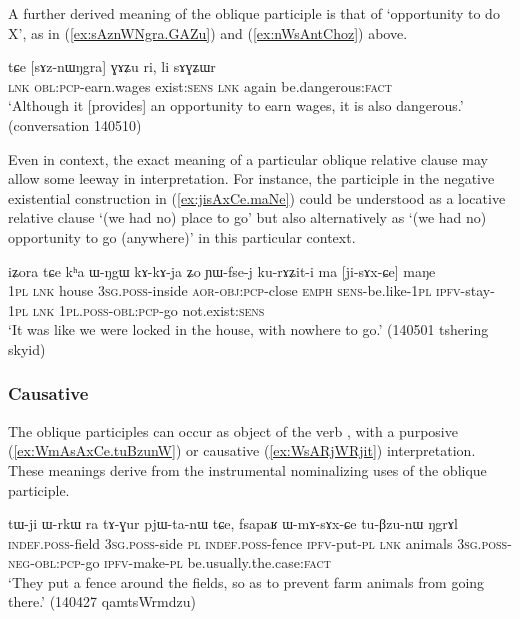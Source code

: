 A further derived meaning of the oblique participle is that of `opportunity to do X', as in (\ref{ex:sAznWNgra.GAZu}) and (\ref{ex:nWsAntChoz}) above.

\begin{exe}
\ex \label{ex:sAznWNgra.GAZu}
\gll tɕe [sɤz-nɯŋgra] ɣɤʑu ri, li sɤɣʑɯr \\
\textsc{lnk} \textsc{obl}:\textsc{pcp}-earn.wages exist:\textsc{sens} \textsc{lnk} again be.dangerous:\textsc{fact} \\
\glt `Although it [provides] an opportunity to earn wages, it is also dangerous.' (conversation 140510)
\end{exe}


Even in context, the exact meaning of a particular oblique relative clause may allow some leeway in interpretation. For instance, the participle  in the negative existential construction in (\ref{ex:jisAxCe.maNe}) could be understood as a locative relative clause `(we had no) place to go' but also alternatively as `(we had no) opportunity to go (anywhere)' in this particular context.

\begin{exe}
\ex \label{ex:jisAxCe.maNe}
\gll  iʑora tɕe kʰa ɯ-ŋgɯ kɤ-kɤ-ja ʑo ɲɯ-fse-j ku-rɤʑit-i ma [ji-sɤx-ɕe] maŋe \\
\textsc{1pl} \textsc{lnk} house \textsc{3sg}.\textsc{poss}-inside \textsc{aor}-\textsc{obj}:\textsc{pcp}-close \textsc{emph} \textsc{sens}-be.like-\textsc{1pl} \textsc{ipfv}-stay-\textsc{1pl} \textsc{lnk} \textsc{1pl}.\textsc{poss}-\textsc{obl}:\textsc{pcp}-go not.exist:\textsc{sens} \\
\glt  `It was like we were locked in the house, with nowhere to go.' (140501 tshering skyid)
\end{exe}

\subsubsection{Causative} \label{sec:oblique.participle.causative}
The oblique participles can occur as object of the verb , with a purposive (\ref{ex:WmAsAxCe.tuBzunW}) or causative (\ref{ex:WsARjWRjit}) interpretation. These meanings derive from the instrumental nominalizing uses of the oblique participle. 

\begin{exe}
\ex \label{ex:WmAsAxCe.tuBzunW}
\gll tɯ-ji ɯ-rkɯ ra tɤ-ɣur pjɯ-ta-nɯ tɕe, fsapaʁ ɯ-mɤ-sɤx-ɕe tu-βzu-nɯ ŋgrɤl \\
\textsc{indef}.\textsc{poss}-field \textsc{3sg}.\textsc{poss}-side \textsc{pl} \textsc{indef}.\textsc{poss}-fence \textsc{ipfv}-put-\textsc{pl} \textsc{lnk} animals \textsc{3sg}.\textsc{poss}-\textsc{neg}-\textsc{obl}:\textsc{pcp}-go \textsc{ipfv}-make-\textsc{pl} be.usually.the.case:\textsc{fact} \\
\glt `They put a fence around the fields, so as to prevent farm animals from going there.' (140427 qamtsWrmdzu) 	
\end{exe}

